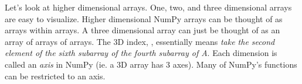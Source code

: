 Let's look at higher dimensional arrays. One, two, and three dimensional
arrays are easy to visualize. Higher dimensional NumPy arrays can be
thought of as arrays within arrays. A three dimensional array can just
be thought of as an array of arrays of arrays. The 3D index, , essentially means \emph{take the second element of the sixth
subarray of the fourth subarray of A}. Each dimension is called an
\emph{axis} in NumPy (ie. a 3D array has 3 axes).  Many of NumPy's
functions can be restricted to an axis. 


